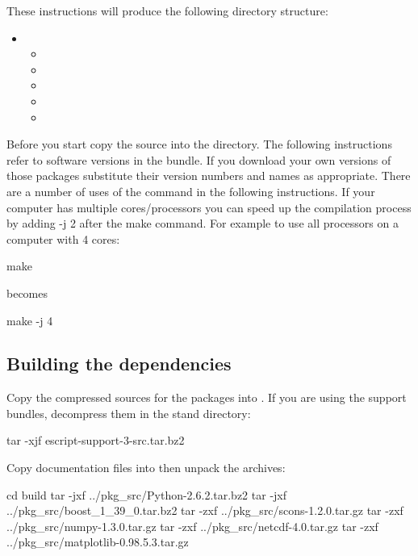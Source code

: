 These instructions will produce the following directory structure:
\begin{itemize}
 \item[]  \begin{itemize}
  \item[] 
  \item[] 
  \item[] 
  \item[] 
  \item[] 
 \end{itemize}
\end{itemize}

Before you start copy the \esfinley source into the  directory.
The following instructions refer to software versions in the  bundle.
If you download your own versions of those packages substitute their version numbers and names as appropriate.
There are a number of uses of the  command in the following instructions.
If your computer has multiple cores/processors you can speed up the compilation process by adding -j 2 after the make command.
For example to use all processors on a computer with 4 cores:
\begin{shellCode}
make
\end{shellCode}
becomes
\begin{shellCode}
make -j 4
\end{shellCode}


\subsection{Building the dependencies}

Copy the compressed sources for the packages into .
If you are using the support bundles, decompress them in the stand directory:
\begin{shellCode}
tar -xjf escript-support-3-src.tar.bz2
\end{shellCode}

Copy documentation files into  then unpack the archives:

\begin{shellCode}
cd build
tar -jxf ../pkg_src/Python-2.6.2.tar.bz2
tar -jxf ../pkg_src/boost_1_39_0.tar.bz2
tar -zxf ../pkg_src/scons-1.2.0.tar.gz
tar -zxf ../pkg_src/numpy-1.3.0.tar.gz
tar -zxf ../pkg_src/netcdf-4.0.tar.gz
tar -zxf ../pkg_src/matplotlib-0.98.5.3.tar.gz
\end{shellCode}

